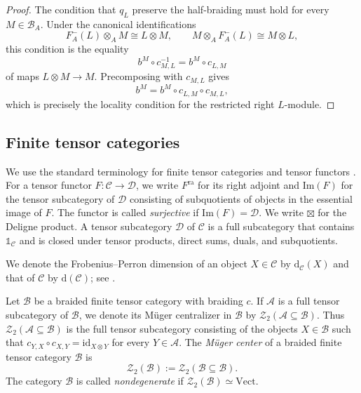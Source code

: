 \documentclass[10pt,a4paper]{amsart}
\numberwithin{equation}{section}
\newcommand{\unit}{\mathds{1}}
\newcommand{\cA}{\mathcal{A}}
\newcommand{\B}{\mathcal{B}}
\newcommand{\C}{\mathcal{C}}
\newcommand{\D}{\mathcal{D}}
\newcommand{\Z}{\mathcal{Z}}
\newcommand{\ra}{\mathrm{ra}}
\newcommand{\im}{\mathrm{Im}}
\newcommand{\FP}{\mathrm{d}}
\newcommand{\Vect}{\mathrm{Vect}}
\newcommand{\id}{\mathrm{id}}
\begin{document}
\begin{proof}
The condition that $q_L$ preserve the half-braiding must hold for every
$M\in\B_A$. Under the canonical identifications
\[
  F_A^-(L)\otimes_A M\cong L\otimes M,
  \qquad
  M\otimes_A F_A^-(L)\cong M\otimes L,
\]
this condition is the equality
\[
  b^M\circ c_{M,L}^{-1}
  =
  b^M\circ c_{L,M}
\]
of maps $L\otimes M\to M$. Precomposing with $c_{M,L}$ gives
\[
  b^M=b^M\circ c_{L,M}\circ c_{M,L},
\]
which is precisely the locality condition for the restricted right
$L$-module.
\end{proof}


\subsection{Finite tensor categories}

We use the standard terminology
for finite tensor categories and tensor functors \cite{etingof2016tensor}. For a tensor functor $F:\C\to\D$, we write
$F^{\ra}$ for its right adjoint and $\im(F)$ for the tensor subcategory of
$\D$ consisting of subquotients of objects in the essential image of $F$.
The functor is called \emph{surjective} if $\im(F) = \D$. We write
$\boxtimes$ for the Deligne product. A tensor subcategory $\D$ of $\C$
is a full subcategory that contains $\unit_\C$ and is closed under tensor
products, direct sums, duals, and subquotients.

We denote the Frobenius--Perron dimension of an object $X\in\C$ by
$\FP_{\C}(X)$ and that of $\C$ by $\FP(\C)$; see
\cite[Section~4]{etingof2016tensor}.


Let $\B$ be a braided finite tensor category with braiding $c$. 
If $\cA$ is a full tensor subcategory of $\B$, we denote its M\"uger
centralizer in $\B$ by $\Z_2(\cA\subseteq\B)$. 
Thus $\Z_2(\cA\subseteq\B)$ is the full tensor subcategory consisting of
the objects $X\in\B$ such that $c_{Y,X}\circ c_{X,Y}=\id_{X\otimes Y}$ 
for every $Y\in\cA$. The \emph{M\"uger center} of a braided finite tensor
category $\B$ is
\[
  \Z_2(\B):=\Z_2(\B\subseteq\B).
\]
The category $\B$ is called \emph{nondegenerate} if $\Z_2(\B)\simeq\Vect$.


\end{document}
